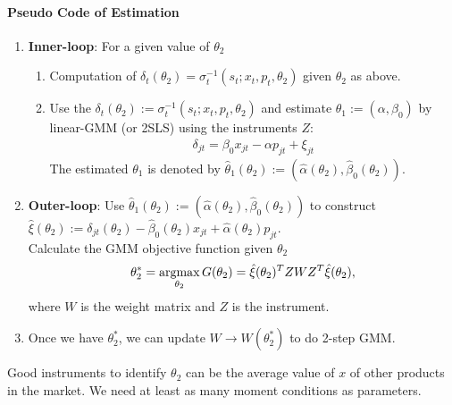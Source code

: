 \documentclass[11pt]{elegantbook}
\newcommand{\argmax}{\operatornamewithlimits{argmax}}
\begin{document}
\paragraph*{Pseudo Code of Estimation}
\begin{enumerate}
    \item \textbf{Inner-loop}: For a given value of $\theta_2$
    \begin{enumerate}
        \item Computation of $\delta_t(\theta_2)=\sigma_{t}^{-1}\left(s_t; x_t,p_t,\theta_2\right)$ given $\theta_2$ as above.
        \item Use the $\delta_t(\theta_2):=\sigma_{t}^{-1}\left(s_t; x_t,p_t,\theta_2\right)$ and estimate $\theta_1:=(\alpha,\beta_0)$ by linear-GMM (or 2SLS) using the instruments $Z$:
        \begin{equation}
            \begin{aligned}
                \delta_{jt}=\beta_0 x_{jt} - \alpha p_{jt} + \xi_{jt}
            \end{aligned}
            \nonumber
        \end{equation}
        The estimated $\theta_1$ is denoted by $\hat{\theta}_1(\theta_2):=(\hat{\alpha}(\theta_2),\hat{\beta}_0(\theta_2))$.
    \end{enumerate}
    \item \textbf{Outer-loop}: Use $\hat{\theta}_1(\theta_2):=(\hat{\alpha}(\theta_2),\hat{\beta}_0(\theta_2))$ to construct $\hat{\xi}(\theta_2):=\delta_{jt}(\theta_2)-\hat{\beta}_0(\theta_2) x_{jt} + \hat{\alpha}(\theta_2) p_{jt}$.\\
    Calculate the GMM objective function given $\theta_2$
    \begin{equation}
        \begin{aligned}
            \theta_2^*=\argmax_{\theta_2}G(\theta_2)=\hat{\xi}(\theta_2)^T Z W Z^T \hat{\xi}(\theta_2),
        \end{aligned}
        \nonumber
    \end{equation}
    where $W$ is the weight matrix and $Z$ is the instrument.
    \item Once we have $\theta_2^*$, we can update $W \rightarrow W(\theta_2^*)$ to do 2-step GMM.
\end{enumerate}
\begin{note}
    Good instruments to identify $\theta_2$ can be the average value of $x$ of other products in the market. We need at least as many moment conditions as parameters.
\end{note}
\end{document}
